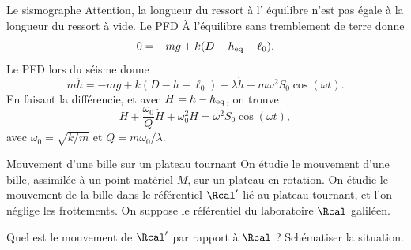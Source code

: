 \begin{exo}[PC][2][TD]{Le sismographe}
{Attention, la longueur du ressort à l' équilibre n'est pas égale à la longueur du ressort à vide. Le PFD À l'équilibre sans tremblement de terre donne
$$
0=-mg +k(D-h_{\rm eq}-\ell_0).
$$
Le PFD lors du séisme donne
$$
m\ddot{h} = -mg +k(D-h-\ell_0) - \lambda \dot{h}  +m\omega^2 S_0 \cos(\omega t).
$$
En faisant la différencie, et avec $H=h-h_{\rm eq}$, on trouve
$$
\ddot{H} + \dfrac{\omega_0}{Q} \dot{H} +\omega_0^2 H = \omega^2 S_0 \cos(\omega t),
$$
avec $\omega_0 = \sqrt{k/m}$ et $Q=m\omega_0/\lambda$.
}

\end{exo}

\begin{exo}[PC][3][python]{Mouvement d'une bille sur un plateau tournant}
On étudie le mouvement d'une bille, assimilée à un point matériel $M$, sur un plateau en rotation. On étudie le mouvement de la bille dans le référentiel $\Rcal'$ lié au plateau tournant, et l'on néglige les frottements. On suppose le référentiel du laboratoire $\Rcal$ galiléen.

\begin{quest}
\item  Quel est le mouvement de $\Rcal'$ par rapport à $\Rcal$ ?
Schématiser la situation.


\end{quest}
\end{exo}
